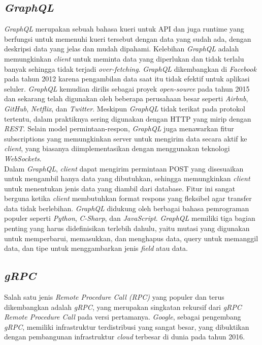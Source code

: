 \subsection{\textit{GraphQL}}
\textit{GraphQL} merupakan sebuah bahasa kueri untuk API dan juga runtime yang berfungsi untuk memenuhi kueri tersebut dengan data yang sudah ada, dengan deskripsi data yang jelas dan mudah dipahami. Kelebihan \textit{GraphQL} adalah memungkinkan \textit{client} untuk meminta data yang diperlukan dan tidak terlalu banyak sehingga tidak terjadi \textit{over-fetching}. \textit{GraphQL} dikembangkan di \textit{Facebook} pada tahun 2012 karena pengambilan data saat itu tidak efektif untuk aplikasi seluler. \textit{GraphQL} kemudian dirilis sebagai proyek \textit{open-source} pada tahun 2015 dan sekarang telah digunakan oleh beberapa perusahaan besar seperti \textit{Airbnb}, \textit{GitHub}, \textit{Netflix}, dan \textit{Twitter}. Meskipun \textit{GraphQL} tidak terikat pada protokol tertentu, dalam praktiknya sering digunakan dengan HTTP yang mirip dengan \textit{REST}. Selain model permintaan-respon, \textit{GraphQL} juga menawarkan fitur subscriptions yang memungkinkan server untuk mengirim data secara aktif ke \textit{client}, yang biasanya diimplementasikan dengan menggunakan teknologi \textit{WebSockets}\cite{6}.\\
Dalam \textit{GraphQL}, \textit{client} dapat mengirim permintaan POST yang disesuaikan untuk mengambil hanya data yang dibutuhkan, sehingga memungkinkan \textit{client} untuk menentukan jenis data yang diambil dari database. Fitur ini sangat berguna ketika \textit{client} membutuhkan format respons yang fleksibel agar transfer data tidak berlebihan. \textit{GraphQL} didukung oleh berbagai bahasa pemrograman populer seperti \textit{Python}, \textit{C-Sharp}, dan \textit{JavaScript}. \textit{GraphQL} memiliki tiga bagian penting yang harus didefinisikan terlebih dahulu, yaitu mutasi yang digunakan untuk memperbarui, memasukkan, dan menghapus data, query untuk memanggil data, dan tipe untuk menggambarkan jenis \textit{field} atau data\cite{2}.\\

\subsection{\textit{gRPC}}
Salah satu jenis \textit{Remote Procedure Call (RPC)} yang populer dan terus dikembangkan adalah \textit{gRPC}, yang merupakan singkatan rekursif dari \textit{gRPC Remote Procedure Call} pada versi pertamanya. \textit{Google}, sebagai pengembang \textit{gRPC}, memiliki infrastruktur terdistribusi yang sangat besar, yang dibuktikan dengan pembangunan infrastruktur \textit{cloud} terbesar di dunia pada tahun 2016\cite{7}.\\

